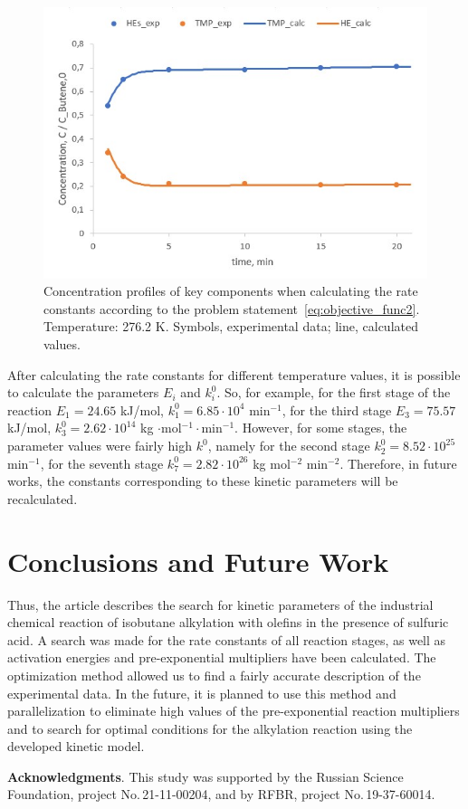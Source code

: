 \documentclass{svproc}
\begin{document}
\begin{figure}
\begin{center}
  \includegraphics[width=0.7\linewidth]{res2.jpg}
  \caption{Concentration profiles of key components when calculating the rate constants according to the problem statement~\ref{eq:objective_func2}. Temperature: 276.2 K. Symbols, experimental data; line, calculated values.}
  \label{fig:res2}  
\end{center}
\end{figure}

After calculating the rate constants for different temperature values, it is possible to calculate the parameters $E_i$ and $k_i^0$. So, for example, for the first stage of the reaction $E_1 = 24.65$ kJ/mol, $k_1^0 = 6.85 \cdot 10^4$ min$^{-1}$, for the third stage $E_3 = 75.57$ kJ/mol, $k_3^0 = 2.62 \cdot 10^{14}$ kg $\cdot$mol$^{-1}\cdot$min$^{-1}$. However, for some stages, the parameter values were fairly high $k^0$, namely for the second stage $k_2^0 = 8.52 \cdot 10^{25}$ min$^{-1}$, for the seventh stage $k_7^0 = 2.82 \cdot 10^{26}$ kg mol$^{-2}$ min$^{-2}$. Therefore, in future works, the constants corresponding to these kinetic parameters will be recalculated.

\section{Conclusions and Future Work}
Thus, the article describes the search for kinetic parameters of the industrial chemical reaction of isobutane alkylation with olefins in the presence of sulfuric acid. A search was made for the rate constants of all reaction stages, as well as activation energies and pre-exponential multipliers have been calculated. The optimization method allowed us to find a fairly accurate description of the experimental data. In the future, it is planned to use this method and parallelization to eliminate high values of the pre-exponential reaction multipliers and to search for optimal conditions for the alkylation reaction using the developed kinetic model.

\medskip

\textbf{Acknowledgments}. This study was supported by the Russian Science Foundation, project No.\,21-11-00204, and by RFBR, project No.\,19-37-60014.

%
%

{}
\end{document}
